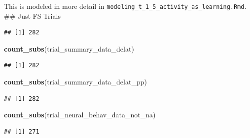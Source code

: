 \documentclass[
]{article}
\newenvironment{Shaded}{\begin{snugshade}}{\end{snugshade}}
\newcommand{\ControlFlowTok}[1]{\textcolor[rgb]{0.13,0.29,0.53}{\textbf{#1}}}
\newcommand{\DecValTok}[1]{\textcolor[rgb]{0.00,0.00,0.81}{#1}}
\newcommand{\KeywordTok}[1]{\textcolor[rgb]{0.13,0.29,0.53}{\textbf{#1}}}
\newcommand{\NormalTok}[1]{#1}
\newcommand{\OperatorTok}[1]{\textcolor[rgb]{0.81,0.36,0.00}{\textbf{#1}}}
\newcommand{\StringTok}[1]{\textcolor[rgb]{0.31,0.60,0.02}{#1}}
\begin{document}
This is modeled in more detail in
\texttt{modeling\_t\_1\_5\_activity\_as\_learning.Rmd}. \#\# Just FS
Trials

\begin{Shaded}
\end{Shaded}

\begin{verbatim}
## [1] 282
\end{verbatim}

\begin{Shaded}
\begin{Highlighting}[]
\KeywordTok{count_subs}\NormalTok{(trial_summary_data_delat)}
\end{Highlighting}
\end{Shaded}

\begin{verbatim}
## [1] 282
\end{verbatim}

\begin{Shaded}
\begin{Highlighting}[]
\KeywordTok{count_subs}\NormalTok{(trial_summary_data_delat_pp)}
\end{Highlighting}
\end{Shaded}

\begin{verbatim}
## [1] 282
\end{verbatim}

\begin{Shaded}
\begin{Highlighting}[]
\KeywordTok{count_subs}\NormalTok{(trial_neural_behav_data_not_na)}
\end{Highlighting}
\end{Shaded}

\begin{verbatim}
## [1] 271
\end{verbatim}

\begin{Shaded}
\end{Shaded}
\end{document}
